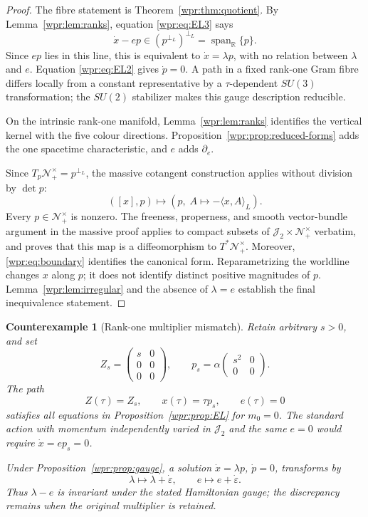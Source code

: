 \documentclass[11pt]{article}
\newtheorem{counterexample}[theorem]{Counterexample}
\newcommand{\J}{\mathcal J_2}
\newcommand{\Nfuture}{\mathcal N_+^\times}
\newcommand{\SpanR}{\operatorname{span}_{\mathbb R}}
\begin{document}
\begin{proof}
The fibre statement is Theorem~\ref{wpr:thm:quotient}.  By
Lemma~\ref{wpr:lem:ranks}, equation \eqref{wpr:eq:EL3} says
\[
 \dot x-e p\in(p^{\perp_L})^{\perp_L}=\SpanR\{p\}.
\]
Since \(ep\) lies in this line, this is equivalent to
\(\dot x=\lambda p\), with no relation between \(\lambda\) and \(e\).
Equation \eqref{wpr:eq:EL2} gives \(\dot p=0\).  A path in a fixed
rank-one Gram fibre differs locally from a constant representative by
a \(\tau\)-dependent \(SU(3)\) transformation; the \(SU(2)\)
stabilizer makes this gauge description reducible.

On the intrinsic rank-one manifold,
Lemma~\ref{wpr:lem:ranks} identifies the vertical kernel with the
five colour directions.  Proposition~\ref{wpr:prop:reduced-forms}
adds the one spacetime characteristic, and \(e\) adds
\(\partial_e\).

Since \(T_p\Nfuture=p^{\perp_L}\), the massive cotangent construction
applies without division by \(\det p\):
\[
 ([x],p)\longmapsto
 \left(p,\;A\longmapsto-\langle x,A\rangle_L\right).
\]
Every \(p\in\Nfuture\) is nonzero.  The freeness, properness, and smooth
vector-bundle argument in the massive proof applies to compact subsets
of \(\J\times\Nfuture\) verbatim, and proves that this map is a
diffeomorphism to \(T^*\Nfuture\).  Moreover,
\eqref{wpr:eq:boundary} identifies the canonical form.  Reparametrizing
the worldline changes \(x\) along \(p\); it does not identify distinct
positive magnitudes of \(p\).  Lemma~\ref{wpr:lem:irregular} and the
absence of \(\lambda=e\) establish the final inequivalence statement.
\end{proof}

\begin{counterexample}[Rank-one multiplier mismatch]
\label{wpr:ce:rank1}
Retain arbitrary \(s>0\), and set
\[
 Z_s=\begin{pmatrix}s&0\\0&0\\0&0\end{pmatrix},\qquad
 p_s=\alpha\begin{pmatrix}s^2&0\\0&0\end{pmatrix}.
\]
The path
\[
 Z(\tau)=Z_s,\qquad x(\tau)=\tau p_s,\qquad e(\tau)=0
\]
satisfies all equations in Proposition~\ref{wpr:prop:EL} for
\(m_0=0\).  The standard action with momentum independently varied in
\(\J\) and the same \(e=0\) would require \(\dot x=e p_s=0\).

Under Proposition~\ref{wpr:prop:gauge}, a solution
\(\dot x=\lambda p\), \(\dot p=0\), transforms by
\[
 \lambda\longmapsto\lambda+\dot\varepsilon,\qquad
 e\longmapsto e+\dot\varepsilon.
\]
Thus \(\lambda-e\) is invariant under the stated Hamiltonian gauge;
the discrepancy remains when the original multiplier is retained.
\end{counterexample}
\end{document}

